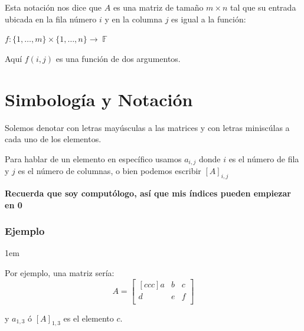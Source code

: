 \documentclass[12pt, fleqn]{report}                             %
\newenvironment{SmallIndentation}[1][0.75em]                    %
        {\begin{adjustwidth}{#1}{}\begin{footnotesize}}             %
        {\end{footnotesize}\end{adjustwidth}}                       %
\theoremstyle{break}                                            %
\DeclareMathOperator \GenericField {\mathbb{F}}                 %
\begin{document}
                Esta notación nos dice que $A$ es una matriz de tamaño $m \times n$ tal
                que su entrada ubicada en la fila número $i$ y en la columna $j$ es igual
                a la función: 

                $f: \{1, \dots, m\} \times \{1, \dots, n\} \to \GenericField$
                
                Aquí $f(i, j)$ es una función de dos argumentos.


        \vspace{1em}
        \section{Simbología y Notación}

            Solemos denotar con letras mayúsculas a las matrices y con letras miniscúlas
            a cada uno de los elementos.

            Para hablar de un elemento en específico usamos $a_{i,j}$ donde $i$ es el
            número de fila y $j$ es el número de columnas, o bien podemos escribir $[A]_{i,j}$

            \textbf{Recuerda que soy computólogo, así que mis índices pueden empiezar en 0}


            \subsubsection*{Ejemplo}
                \begin{SmallIndentation}[1em]
                    
                    Por ejemplo, una matriz sería:
                    \begin{equation*}
                        A =
                        \begin{bmatrix}[ccc]
                            a & b & c   \\
                            d & e & f   \\
                        \end{bmatrix}
                    \end{equation*}

                    y $a_{1,3}$ ó $[A]_{1, 3}$ es el elemento $c$.
                
                \end{SmallIndentation}
                
\end{document}
